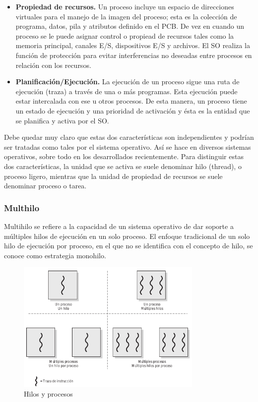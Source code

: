 \documentclass{article}
\begin{document}
				\begin{itemize}
				\item \textbf{Propiedad de recursos.} Un proceso incluye un espacio de direcciones virtuales para el manejo de la imagen del proceso; esta es la colección de programa, datos, pila y atributos definido en el PCB. De vez en cuando un proceso se le puede asignar control o propiead de recursos tales como la memoria principal, canales E/S, dispositivos E/S y archivos. El SO realiza la función de protección para evitar interferencias no deseadas entre procesos en relación con los recursos. 
				\item \textbf{Planificación/Ejecución.} La ejecución de un proceso sigue una ruta de ejecución (traza) a través de una o más programas. Esta ejecución puede estar intercalada con ese u otros procesos. De esta manera, un proceso tiene un estado de ejecución y una prioridad de activación y ésta es la entidad que se planifica y activa por el SO.
				\end{itemize}
				
				Debe quedar muy claro que estas dos características son independientes y podrían ser tratadas como tales por el sistema operativo. Así se hace en diversos sistemas operativos, sobre todo en los desarrollados recientemente. Para distinguir estas dos características, la unidad que se activa se suele denominar hilo (thread), o proceso ligero, mientras que la unidad de propiedad de recursos se suele denominar proceso o tarea.
				
				\subsubsection{Multhilo}
					Multihilo se refiere a la capacidad de un sistema operativo de dar soporte a múltiples hilos de ejecución en un solo proceso. El enfoque tradicional de un solo hilo de ejecución por proceso, en el que no se identifica con el concepto de hilo, se conoce como estrategia monohilo.	
					
					\begin{figure}
					\caption{Hilos y procesos}
					\label{figura2.17:hilos y procesos}
					\centering
					\includegraphics[width=0.8\textwidth, scale=1]{tema_2_figura17.png}
					\end{figure}
					
\end{document}
